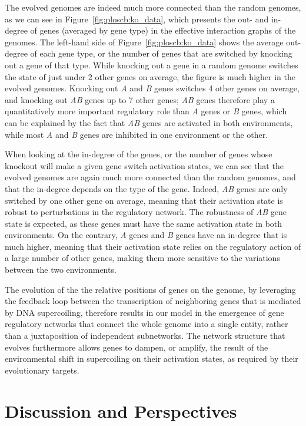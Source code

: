 The evolved genomes are indeed much more connected than the random genomes, as we can see in Figure~\ref{fig:ploscb:ko_data}, which presents the out- and in-degree of genes (averaged by gene type) in the effective interaction graphs of the genomes.
The left-hand side of Figure~\ref{fig:ploscb:ko_data} shows the average out-degree of each gene type, or the number of genes that are switched by knocking out a gene of that type.
While knocking out a gene in a random genome switches the state of just under 2 other genes on average, the figure is much higher in the evolved genomes.
Knocking out \emph{A} and \emph{B} genes switches 4 other genes on average, and knocking out \emph{AB} genes up to 7 other genes;
\emph{AB} genes therefore play a quantitatively more important regulatory role than \emph{A} genes or \emph{B} genes, which can be explained by the fact that \emph{AB} genes are activated in both environments, while most \emph{A} and \emph{B} genes are inhibited in one environment or the other.

When looking at the in-degree of the genes, or the number of genes whose knockout will make a given gene switch activation states, we can see that the evolved genomes are again much more connected than the random genomes, and that the in-degree depends on the type of the gene.
Indeed, \emph{AB} genes are only switched by one other gene on average, meaning that their activation state is robust to perturbations in the regulatory network.
The robustness of \emph{AB} gene state is expected, as these genes must have the same activation state in both environments.
On the contrary, \emph{A} genes and \emph{B} genes have an in-degree that is much higher, meaning that their activation state relies on the regulatory action of a large number of other genes, making them more sensitive to the variations between the two environments.

The evolution of the the relative positions of genes on the genome, by leveraging the feedback loop between the transcription of neighboring genes that is mediated by DNA supercoiling, therefore results in our model in the emergence of gene regulatory networks that connect the whole genome into a single entity, rather than a juxtaposition of independent subnetworks.
The network structure that evolves furthermore allows genes to dampen, or amplify, the result of the environmental shift in supercoiling on their activation states, as required by their evolutionary targets.

\section{Discussion and Perspectives}

